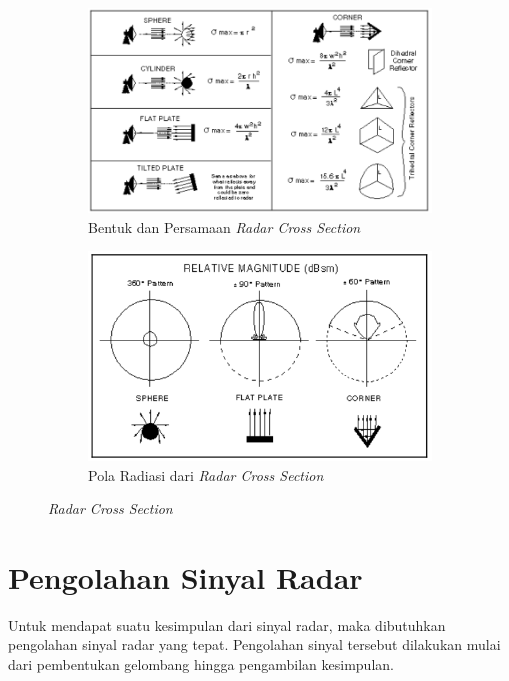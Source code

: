 \begin{center}
	\begin{figure}[h!]
		\begin{subfigure}[b]{0.5\linewidth}
			\includegraphics[width=\linewidth]{pics/bab2/rcsBentuk.png}
			\caption{Bentuk dan Persamaan \textit{Radar Cross Section}}
			\end{subfigure}
			\begin{subfigure}[b]{0.5\linewidth}
				\includegraphics[width=\linewidth]{pics/bab2/rcsPola.png}
				\caption{Pola Radiasi dari \textit{Radar Cross Section}}
				\end{subfigure}
		\caption[\textit{Radar Cross Section}]{\textit{Radar Cross Section} \cite{ONeill2012}}
		\label{pic:RCS}
		\end{figure}
\end{center}

\section{Pengolahan Sinyal Radar}
Untuk mendapat suatu kesimpulan dari sinyal radar, maka dibutuhkan pengolahan sinyal radar yang tepat. Pengolahan sinyal tersebut dilakukan mulai dari pembentukan gelombang hingga pengambilan kesimpulan. 

